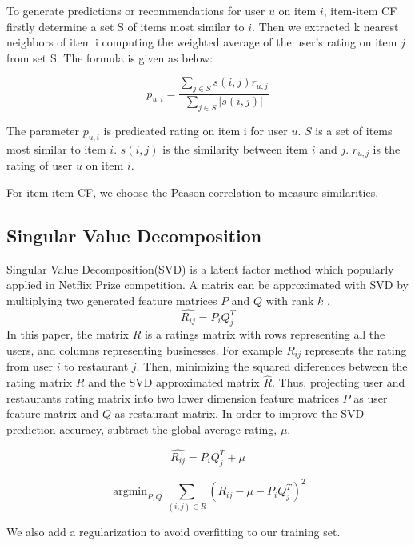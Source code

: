 \documentclass{llncs}
\DeclareMathOperator*{\argmin}{argmin}
\begin{document}
To generate predictions or recommendations for user $u$ on item $i$, item-item CF firstly determine a set S of items most similar to $i$. Then we extracted k nearest neighbors of item i computing the weighted average of the user's rating on item $j$ from set S. The formula is given as below:

\begin{equation}
p_{u,i} =\frac
{\sum\nolimits_{j \in S} s(i,j)r_{u,j}} 
{\sum\nolimits_{j \in S} |s(i,j)|}
\end{equation}

The parameter $p_{u,i}$ is predicated rating on item i for user $u$. $S$ is a set of items most similar to item $i$. $s(i,j)$ is the similarity between item $i$ and $j$. $r_{u,j}$ is the rating of user $u$ on item $i$.

For item-item CF, we choose the Peason correlation to measure similarities. 


\subsection{Singular Value Decomposition}
Singular Value Decomposition(SVD) is a latent factor method which popularly applied in Netflix Prize competition. A matrix can be approximated with SVD by multiplying two generated feature matrices $P$ and $Q$ with rank $k$ \cite{Naomi}.
\begin{equation}
\hat{R_{ij}} = P_iQ_{j}^{T}
\end{equation}
In this paper, the matrix $R$ is a ratings matrix with rows representing all the users, and columns representing businesses. For example $R_{ij}$ represents the rating from user $i$ to restaurant $j$. Then, minimizing the squared differences between the rating matrix $R$ and the SVD approximated matrix $\hat{R}$. Thus, projecting user and restaurants rating matrix into two lower dimension feature matrices $P$ as user feature matrix and $Q$ as restaurant matrix. In order to improve the SVD prediction accuracy, subtract the global average rating, $\mu$.

\begin{equation}
\hat{R_{ij}} = P_iQ_{j}^{T} + \mu
\end{equation}

\begin{equation}
\argmin_{P,Q}\sum_{(i,j)\in{R}}{(R_{ij} - \mu - P_iQ_{j}^{T})}^2
\end{equation}

We also add a regularization to avoid overfitting to our training set.
\end{document}
